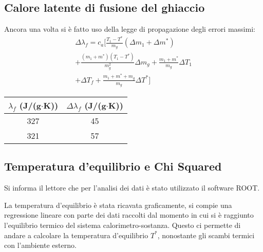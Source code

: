 \documentclass[10pt,twocolumn]{article}
\begin{document}
\subsection{Calore latente di fusione del ghiaccio}
Ancora una volta si è fatto uso della legge di propagazione degli errori massimi:
\begin{multline*}
\Delta \lambda_f = c_a \Bigg[
\frac{T_1 - T^*}{m_g} (\Delta m_1 + \Delta m^*) \\
+ \frac{(m_1 + m^*)(T_1 - T^*)}{m_g^2} \Delta m_g 
+ \frac{m_1 + m^*}{m_g} \Delta T_1 \\
+ \Delta T_f 
+ \frac{m_1 + m^* + m_g}{m_g} \Delta T^* 
\Bigg]
\end{multline*}
  \begin{table}[H]
    \centering
		\begin{tabular}{|c|c|}
		\hline 
        $\lambda_f$ (J/(g$\cdot$K)) & $\Delta \lambda_f$ (J/(g$\cdot$K))  \\ \hline
		327 & 45 \\ \hline
        321 & 57 \\ \hline
		\end{tabular}
	\end{table}

    \begin{center}
        
    \end{center}
\subsection{Temperatura d'equilibrio e Chi Squared}
\begin{nota}
Si informa il lettore che per l'analisi dei dati è stato utilizzato il software ROOT.
\end{nota}
La temperatura d'equilibrio è stata ricavata graficamente, si compie una regressione lineare con parte dei dati raccolti dal momento in cui si è raggiunto l'equilibrio termico del sistema calorimetro-sostanza. Questo 
ci permette di andare a calcolare la temperatura d'equilibrio $T^*$, nonostante gli scambi termici con l'ambiente esterno.
\end{document}
